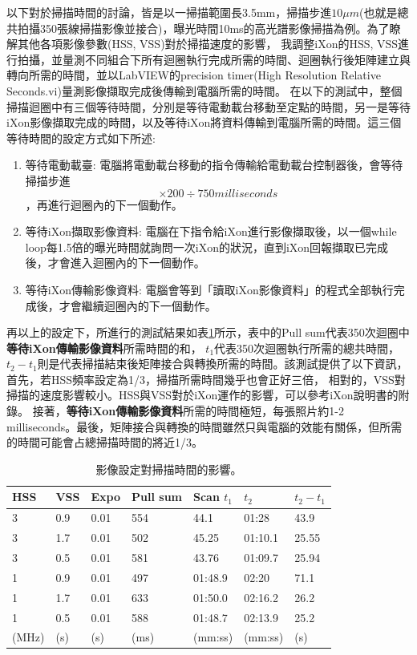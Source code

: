 \documentclass[12pt]{article}
\begin{document}
    以下對於掃描時間的討論，皆是以一掃描範圍長3.5mm，掃描步進$10\mu m$(也就是總共拍攝350張線掃描影像並接合)，曝光時間10ms的高光譜影像掃描為例。為了瞭解其他各項影像參數(HSS, VSS)對於掃描速度的影響，
    我調整iXon的HSS, VSS進行拍攝，並量測不同組合下所有迴圈執行完成所需的時間、迴圈執行後矩陣建立與轉向所需的時間，並以LabVIEW的precision timer(High Resolution Relative Seconds.vi)量測影像擷取完成後傳輸到電腦所需的時間。
    在以下的測試中，整個掃描迴圈中有三個等待時間，分別是等待電動載台移動至定點的時間，另一是等待iXon影像擷取完成的時間，以及等待iXon將資料傳輸到電腦所需的時間。這三個等待時間的設定方式如下所述:
    \begin{enumerate}
        \item 等待電動載臺: 電腦將電動載台移動的指令傳輸給電動載台控制器後，會等待掃描步進\begin{equation} \label{eq: stageWait}
            \times 200 \div 750 milliseconds
        \end{equation}，再進行迴圈內的下一個動作。
        \item 等待iXon擷取影像資料: 電腦在下指令給iXon進行影像擷取後，以一個while loop每1.5倍的曝光時間就詢問一次iXon的狀況，直到iXon回報擷取已完成後，才會進入迴圈內的下一個動作。
        \item 等待iXon傳輸影像資料: 電腦會等到「讀取iXon影像資料」的程式全部執行完成後，才會繼續迴圈內的下一個動作。
    \end{enumerate}
    再以上的設定下，所進行的測試結果如表\ref{tab: measuring}所示，表中的Pull sum代表350次迴圈中\textbf{等待iXon傳輸影像資料}所需時間的和，
    $t_1$代表350次迴圈執行所需的總共時間，$t_2-t_1$則是代表掃描結束後矩陣接合與轉換所需的時間。該測試提供了以下資訊，首先，若HSS頻率設定為1/3，掃描所需時間幾乎也會正好三倍，
    相對的，VSS對掃描的速度影響較小。HSS與VSS對於iXon運作的影響，可以參考iXon說明書的附錄。\cite{ixonManual}
    接著，\textbf{等待iXon傳輸影像資料}所需的時間極短，每張照片約1-2 milliseconds。最後，矩陣接合與轉換的時間雖然只與電腦的效能有關係，但所需的時間可能會占總掃描時間的將近1/3。
    \begin{table}[]
        \centering
        \begin{tabular}{lll||llll}
        HSS & VSS & Expo & Pull sum & Scan $t_1$  & $t_2$      & $t_2-t_1$  \\ \hline \hline
        3   & 0.9 & 0.01 & 554       & 44.1    & 01:28   & 43.9  \\ \hline
        3   & 1.7 & 0.01 & 502       & 45.25   & 01:10.1 & 25.55 \\ \hline
        3   & 0.5 & 0.01 & 581       & 43.76   & 01:09.7 & 25.94 \\ \hline
        1   & 0.9 & 0.01 & 497       & 01:48.9 & 02:20   & 71.1  \\ \hline
        1   & 1.7 & 0.01 & 633       & 01:50.0 & 02:16.2 & 26.2  \\ \hline
        1   & 0.5 & 0.01 & 588       & 01:48.7 & 02:13.9 & 25.2  \\
        (MHz)&(s)     &(s)    & (ms)         & (mm:ss)       & (mm:ss)       & (s)   
        \end{tabular}
        \label{tab: measuring}
        \caption{影像設定對掃描時間的影響。}
    \end{table}
\end{document}
